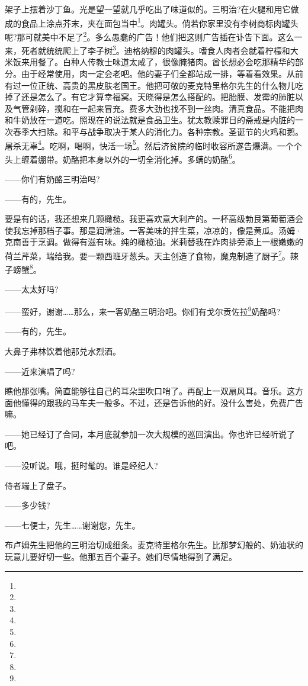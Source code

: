 \par 架子上摆着沙丁鱼。光是望一望就几乎吃出了味道似的。三明治?在火腿和用它做成的食品上涂点芥末，夹在面包当中\footnote{}。肉罐头。倘若你家里没有李树商标肉罐头呢?那可就美中不足了\footnote{}。多么愚蠢的广告！他们把这则广告插在讣告下面。这么一来，死者就统统爬上了李子树\footnote{}。迪格纳穆的肉罐头。嗜食人肉者会就着柠檬和大米饭来用餐了。白种人传教士味道太咸了，很像腌猪肉。酋长想必会吃那精华的部分。由于经常使用，肉一定会老吧。他的妻子们全都站成一排，等着看效果。从前有过一位正统、高贵的黑皮肤老国王。他把可敬的麦克特里格尔先生的什么物儿吃掉了还是怎么了。有它才算幸福窝。天晓得是怎么搭配的。把胎膜、发霉的肺脏以及气管剁碎，搅和在一起来冒充。费多大劲也找不到一丝肉。清真食品。不能把肉和牛奶放在一道吃。照现在的说法就是食品卫生。犹太教赎罪日的斋戒是内脏的一次春季大扫除。和平与战争取决于某人的消化力。各种宗教。圣诞节的火鸡和鹅。屠杀无辜\footnote{}。吃啊，喝啊，快活一场\footnote{}。然后济贫院的临时收容所遂告爆满。一个个头上缠着绷带。奶酪把本身以外的一切全消化掉。多螨的奶酪\footnote{}。
\par ——你们有奶酪三明治吗?
\par ——有的，先生。
\par 要是有的话，我还想来几颗橄榄。我更喜欢意大利产的。一杯高级勃艮第葡萄酒会使我忘掉那档子事。那是润滑油。一客美味的拌生菜，凉凉的，像是黄瓜。汤姆·克南善于烹调。做得有滋有味。纯的橄榄油。米莉替我在炸肉排旁添上一根嫩嫩的荷兰芹菜，端给我。要一颗西班牙葱头。天主创造了食物，魔鬼制造了厨子\footnote{}。辣子螃蟹\footnote{}。
\par ——太太好吗?
\par ——蛮好，谢谢……那么，来一客奶酪三明治吧。你们有戈尔贡佐拉\footnote{}奶酪吗?
\par ——有的，先生。
\par 大鼻子弗林饮着他那兑水烈酒。
\par ——近来演唱了吗?
\par 瞧他那张嘴。简直能够往自己的耳朵里吹口哨了。再配上一双扇风耳。音乐。这方面他懂得的跟我的马车夫一般多。不过，还是告诉他的好。没什么害处，免费广告嘛。
\par ——她已经订了合同，本月底就参加一次大规模的巡回演出。你也许已经听说了吧。
\par ——没听说。哦，挺时髦的。谁是经纪人?
\par 侍者端上了盘子。
\par ——多少钱?
\par ——七便士，先生……谢谢您，先生。
\par 布卢姆先生把他的三明治切成细条。麦克特里格尔先生。比那梦幻般的、奶油状的玩意儿要好切一些。他那五百个妻子。她们尽情地得到了满足。
